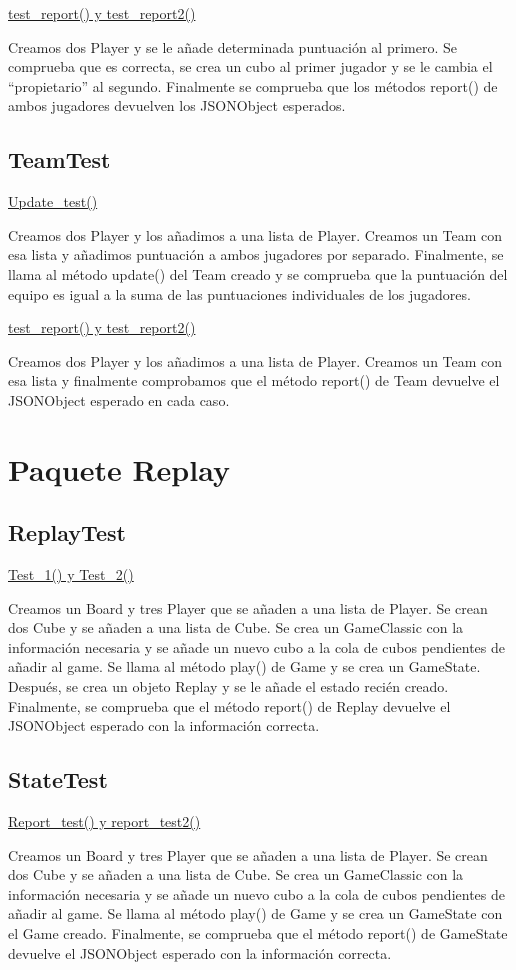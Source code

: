 \documentclass[../DocumentoOficial.tex]{subfiles}
\begin{document}
\underline{test\_report() y test\_report2()}

Creamos dos Player y se le añade determinada puntuación al primero. Se comprueba que es correcta, se crea un cubo al primer jugador y se le cambia el “propietario” al segundo. Finalmente se comprueba que los métodos report() de ambos jugadores devuelven los JSONObject esperados.

\subsection{TeamTest}
\underline{Update\_test()}

Creamos dos Player y los añadimos a una lista de Player. Creamos un Team con esa lista y añadimos puntuación a ambos jugadores por separado. Finalmente, se llama al método update() del Team creado y se comprueba que la puntuación del equipo es igual a la suma de las puntuaciones individuales de los jugadores.

\underline{test\_report() y test\_report2()}

Creamos dos Player y los añadimos a una lista de Player. Creamos un Team con esa lista y finalmente comprobamos que el método report() de Team devuelve el JSONObject esperado en cada caso.

\section{Paquete Replay}
\subsection{ReplayTest}
\underline{Test\_1() y Test\_2()}

Creamos un Board y tres Player que se añaden a una lista de Player. Se crean dos Cube y se añaden a una lista de Cube. Se crea un GameClassic con la información necesaria y se añade un nuevo cubo a la cola de cubos pendientes de añadir al game. Se llama al método play() de Game y se crea un GameState. Después, se crea un objeto Replay y se le añade el estado recién creado. Finalmente, se comprueba que el método report() de Replay devuelve el JSONObject esperado con la información correcta.

\subsection{StateTest}
\underline{Report\_test() y report\_test2()}

Creamos un Board y tres Player que se añaden a una lista de Player. Se crean dos Cube y se añaden a una lista de Cube. Se crea un GameClassic con la información necesaria y se añade un nuevo cubo a la cola de cubos pendientes de añadir al game. Se llama al método play() de Game y se crea un GameState con el Game creado. Finalmente, se comprueba que el método report() de GameState devuelve el JSONObject esperado con la información correcta.
\end{document}
